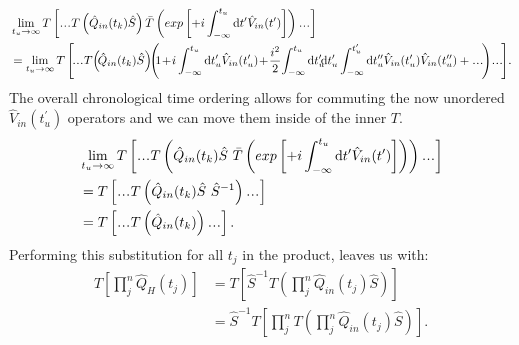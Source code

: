 \documentclass[12pt, titlepage]{article}
\newcommand\mydots{\makebox[1em][c]{.\hfil.\hfil.}}
\begin{document}
\begin{equation}
\begin{split}
&
\lim\limits_{t_{u}\rightarrow \infty}
T\left[
\mydots
T
\left( 
\hat{Q}_{in}(t_{k})
\hat{S}
\right) 
\bar{T}\left( exp\left[+i\int_{- \infty}^{t_{u}}\mathrm{d}t^{\prime} \hat{V}_{in}(t^{\prime})\right] \right)
\mydots
\right]
\\
&=
\lim\limits_{t_{u}\rightarrow \infty}
T\left[\!
\mydots
T\!
\left( \!
\hat{Q}_{in}(t_{k})
\hat{S}
\right) \!\!
\left(\!\!
 1\!+\!
 i\int_{- \infty}^{t_{u}}\mathrm{d}t_{u}^{\prime}\hat{V}_{in}(t_{u}^{\prime})\!
 +\!
 \frac{i^{2}}{2}\!
 \int_{- \infty}^{t_{u}}\mathrm{d}t_{u}^{\prime}\!\!
 \mathrm{d}t_{u}^{\prime} 
 \int_{- \infty}^{t_{u}^{\prime}}
 \mathrm{d}t_{u}^{\prime \prime}
 \hat{V}_{in}(t_{u}^{\prime})
 \hat{V}_{in}(t_{u}^{\prime\prime})
 +\mydots\!
 \right)\!
\mydots\!
\right]\!
.
\end{split}
\end{equation}
The overall chronological time ordering allows for commuting the now unordered $ \hat{V}_{in}(t_{u}^{\prime}) $ operators and we can move them inside of the inner $ T $. 
\begin{equation}
\begin{split}
&
\lim\limits_{t_{u}\rightarrow \infty}
T\left[
\mydots
T
\left( 
\hat{Q}_{in}(t_{k}) 
\hat{S}
\
\bar{T}\left( exp\left[+i\int_{- \infty}^{t_{u}}\mathrm{d}t^{\prime} \hat{V}_{in}(t^{\prime})\right] \right)
\right) 
\mydots
\right]
\\
&=
T\left[
\mydots
T
\left( 
\hat{Q}_{in}(t_{k}) 
\hat{S}
\
\hat{S}^{-1}
\right) 
\mydots
\right]
\\
&=
T\left[
\mydots
T
\left( 
\hat{Q}_{in}(t_{k}) 
\right) 
\mydots
\right]
.
\end{split}
\end{equation}
Performing this substitution for all $ t_{j} $ in the product, leaves us with:
\begin{equation}
\begin{split}
T\left[
\prod_{j}^{n}
\hat{Q}_{H}(t_j)
\right]
&=
T\left[
\hat{S}^{-1} 
T
\left( 
\prod_{j}^{n}
\hat{Q}_{in}(t_{j})
\hat{S}
\right) 
\right]
\\
&=
\hat{S}^{-1} 
T\left[
\prod_{j}^{n}
T
\left(
 \prod_{j}^{n}
\hat{Q}_{in}(t_{j})
\hat{S}
\right) 
\right]
.
\end{split}
\end{equation}
\end{document}
